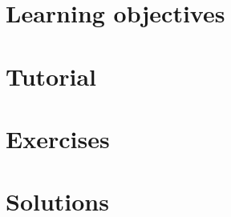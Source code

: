 \documentclass[
]{book}
\begin{document}
\hypertarget{learning-objectives-11}{%
\section{Learning objectives}\label{learning-objectives-11}}

\hypertarget{tutorial-11}{%
\section{Tutorial}\label{tutorial-11}}

\hypertarget{exercises-11}{%
\section{Exercises}\label{exercises-11}}

\hypertarget{solutions-11}{%
\section{Solutions}\label{solutions-11}}

  
\end{document}
